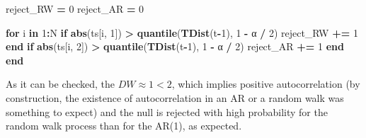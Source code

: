 \documentclass[
]{article}
\newenvironment{Shaded}{\begin{snugshade}}{\end{snugshade}}
\newcommand{\ControlFlowTok}[1]{\textcolor[rgb]{0.13,0.29,0.53}{\textbf{#1}}}
\newcommand{\FloatTok}[1]{\textcolor[rgb]{0.00,0.00,0.81}{#1}}
\newcommand{\FunctionTok}[1]{\textcolor[rgb]{0.13,0.29,0.53}{\textbf{#1}}}
\newcommand{\KeywordTok}[1]{\textcolor[rgb]{0.13,0.29,0.53}{\textbf{#1}}}
\newcommand{\NormalTok}[1]{#1}
\newcommand{\OperatorTok}[1]{\textcolor[rgb]{0.81,0.36,0.00}{\textbf{#1}}}
\begin{document}
\begin{Shaded}
\begin{Highlighting}[]
\NormalTok{reject\_RW }\OperatorTok{=} \FloatTok{0}
\NormalTok{reject\_AR }\OperatorTok{=} \FloatTok{0}

\ControlFlowTok{for}\NormalTok{ i }\KeywordTok{in} \FloatTok{1}\OperatorTok{:}\NormalTok{N}
    \ControlFlowTok{if} \FunctionTok{abs}\NormalTok{(ts[i, }\FloatTok{1}\NormalTok{]) }\OperatorTok{\textgreater{}} \FunctionTok{quantile}\NormalTok{(}\FunctionTok{TDist}\NormalTok{(t}\OperatorTok{{-}}\FloatTok{1}\NormalTok{), }\FloatTok{1} \OperatorTok{{-}}\NormalTok{ α }\OperatorTok{/} \FloatTok{2}\NormalTok{)}
\NormalTok{        reject\_RW }\OperatorTok{+=} \FloatTok{1}
    \ControlFlowTok{end}
    \ControlFlowTok{if} \FunctionTok{abs}\NormalTok{(ts[i, }\FloatTok{2}\NormalTok{]) }\OperatorTok{\textgreater{}} \FunctionTok{quantile}\NormalTok{(}\FunctionTok{TDist}\NormalTok{(t}\OperatorTok{{-}}\FloatTok{1}\NormalTok{), }\FloatTok{1} \OperatorTok{{-}}\NormalTok{ α }\OperatorTok{/} \FloatTok{2}\NormalTok{)}
\NormalTok{        reject\_AR }\OperatorTok{+=} \FloatTok{1}
    \ControlFlowTok{end}
\ControlFlowTok{end}
\end{Highlighting}
\end{Shaded}

As it can be checked, the \(DW \approx 1 < 2\), which implies positive
autocorrelation (by construction, the existence of autocorrelation in an
AR or a random walk was something to expect) and the null is rejected
with high probability for the random walk process than for the AR(1), as
expected.
\end{document}
